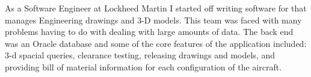 



As a Software Engineer at Lockheed Martin I started off writing software for that manages Engineering drawings and 3-D models.
This team was faced with many problems having to do with dealing with large amounts of data. 
The back end was an Oracle database and some of the core features of the application included: 3-d spacial queries, clearance testing, releasing drawings and models, and providing bill of material information for each configuration of the aircraft.
